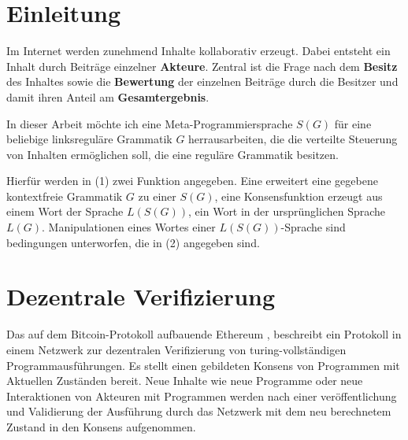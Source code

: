 \documentclass[]{article}
\author{}
\date{}
\begin{document}
\tableofcontents


\newpage

\section{Einleitung}

Im Internet werden zunehmend Inhalte kollaborativ erzeugt. 
Dabei entsteht ein Inhalt durch Beiträge einzelner \textbf{Akteure}.
Zentral ist die Frage nach dem \textbf{Besitz} des Inhaltes sowie die \textbf{Bewertung} der einzelnen Beiträge durch die Besitzer und damit ihren Anteil am \textbf{Gesamtergebnis}. 



In dieser Arbeit möchte ich eine Meta-Programmiersprache
\textbf{$S(G)$} für eine beliebige linksreguläre Grammatik
$G$ herrausarbeiten, die die verteilte Steuerung von Inhalten ermöglichen soll, die eine reguläre Grammatik besitzen.



Hierfür werden in (1) zwei Funktion angegeben. Eine erweitert eine
gegebene kontextfreie Grammatik $G$ zu einer $S(G)$, eine Konsensfunktion erzeugt aus einem Wort der Sprache $L(S(G))$, ein Wort in der ursprünglichen Sprache
$L(G)$. Manipulationen eines Wortes einer $L(S(G))$-Sprache sind bedingungen
unterworfen, die in (2) angegeben sind.


\newpage





\section{Dezentrale Verifizierung}

Das auf dem Bitcoin-Protokoll aufbauende Ethereum \cite{Wood2014}, beschreibt ein Protokoll in einem Netzwerk zur dezentralen Verifizierung von turing-vollständigen Programmausführungen. 
Es stellt einen gebildeten Konsens von Programmen mit Aktuellen Zuständen bereit. 
Neue Inhalte wie neue Programme oder neue Interaktionen von Akteuren mit Programmen werden nach einer veröffentlichung und Validierung der Ausführung durch das Netzwerk mit dem neu berechnetem Zustand in den Konsens aufgenommen.
\end{document}
